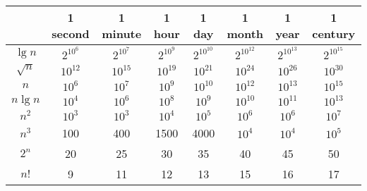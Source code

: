 \begin{center}
	\begin{tabular}{c|c|c|c|c|c|c|c}
		& 1 second & 1 minute & 1 hour & 1 day & 1 month & 1 year & 1 century  \\ \hline
		$\lg n$		& $2^{10^6}$ & $2^{10^7}$ & $2^{10^9}$  & $2^{10^{10}}$ & $2^{10^{12}}$ & $2^{10^{13}}$ & $2^{10^{15}}$ \\ \hline
		$\sqrt{n}$	& $10^{12}$ & $10^{15}$ & $10^{19}$ & $10^{21}$ & $10^{24}$ & $10^{26}$ & $10^{30}$ \\ \hline
		$n$			& $10^{6}$ & $10^{7}$ & $10^{9}$ & $10^{10}$ & $10^{12}$ & $10^{13}$ & $10^{15}$ \\ \hline
		$n \lg n$	& $10^{4}$ & $10^{6}$ & $10^{8}$ & $10^{9}$ & $10^{10}$ & $10^{11}$ & $10^{13}$ \\ \hline
		$n^2$		& $10^{3}$ & $10^{3}$ & $10^{4}$ & $10^{5}$ & $10^{6}$ & $10^{6}$ & $10^{7}$ \\ \hline
		$n^3$		& 100 & 400 & 1500 & 4000 & $10^{4}$ & $10^{4}$ & $10^{5}$ \\ \hline
		$2^n$		& 20 & 25 & 30 & 35 & 40 & 45 & 50 \\ \hline
		$n!$		& 9 & 11 & 12 & 13 & 15 & 16 & 17
	\end{tabular}
\end{center}
